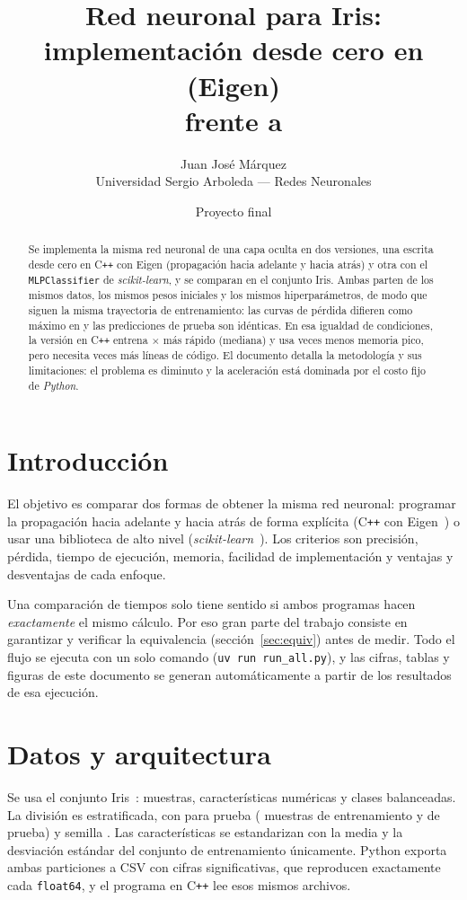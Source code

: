 \documentclass[11pt,a4paper]{article}
\title{Red neuronal para Iris: implementaci\'on desde cero en \cpp (Eigen)\\frente a \sk}
\author{Juan Jos\'e M\'arquez\\Universidad Sergio Arboleda --- Redes Neuronales}
\date{Proyecto final}
\newcommand{\cpp}{C\texttt{++}\xspace}
\newcommand{\sk}{\textit{scikit-learn}\xspace}
\begin{document}
\maketitle

\begin{abstract}
Se implementa la misma red neuronal de una capa oculta en dos versiones, una escrita desde cero en \cpp con Eigen (propagaci\'on hacia adelante y hacia atr\'as) y otra con el \texttt{MLPClassifier} de \sk, y se comparan en el conjunto Iris. Ambas parten de los mismos datos, los mismos pesos iniciales y los mismos hiperpar\'ametros, de modo que siguen la misma trayectoria de entrenamiento: las curvas de p\'erdida difieren como m\'aximo en \maxLossDiff{} y las predicciones de prueba son id\'enticas. En esa igualdad de condiciones, la versi\'on en \cpp entrena \speedupMedian{}$\times$ m\'as r\'apido (mediana) y usa \memRatio{} veces menos memoria pico, pero necesita \locRatio{} veces m\'as l\'ineas de c\'odigo. El documento detalla la metodolog\'ia y sus limitaciones: el problema es diminuto y la aceleraci\'on est\'a dominada por el costo fijo de \textit{Python}.
\end{abstract}

\section{Introducci\'on}
El objetivo es comparar dos formas de obtener la misma red neuronal: programar la propagaci\'on hacia adelante y hacia atr\'as de forma expl\'icita (\cpp con Eigen~\cite{eigen}) o usar una biblioteca de alto nivel (\sk~\cite{pedregosa2011}). Los criterios son precisi\'on, p\'erdida, tiempo de ejecuci\'on, memoria, facilidad de implementaci\'on y ventajas y desventajas de cada enfoque.

Una comparaci\'on de tiempos solo tiene sentido si ambos programas hacen \emph{exactamente} el mismo c\'alculo. Por eso gran parte del trabajo consiste en garantizar y verificar la equivalencia (secci\'on~\ref{sec:equiv}) antes de medir. Todo el flujo se ejecuta con un solo comando (\texttt{uv run run\_all.py}), y las cifras, tablas y figuras de este documento se generan autom\'aticamente a partir de los resultados de esa ejecuci\'on.

\section{Datos y arquitectura}
Se usa el conjunto Iris~\cite{fisher1936}: \nTotal{} muestras, \nFeatures{} caracter\'isticas num\'ericas y \nClasses{} clases balanceadas. La divisi\'on es estratificada, con \testFraction{} para prueba (\nTrain{} muestras de entrenamiento y \nTest{} de prueba) y semilla \seedValue{}. Las caracter\'isticas se estandarizan con la media y la desviaci\'on est\'andar del conjunto de entrenamiento \'unicamente. Python exporta ambas particiones a CSV con \csvDigits{} cifras significativas, que reproducen exactamente cada \texttt{float64}, y el programa en \cpp lee esos mismos archivos.
\end{document}
